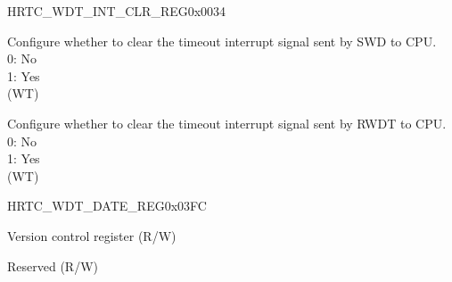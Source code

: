 \begin{register}{H}{RTC\_WDT\_INT\_CLR\_REG}{0x0034}\label{regdesc:RTCWDTINTCLRREG}
%
%
%
\regnewline%
\begin{regdesc}\begin{reglist}
\label{fielddesc:RTCWDTSUPERWDTINTCLR}\item [RTC\_WDT\_SWD\_INT\_CLR] Configure whether to clear the timeout interrupt signal sent by SWD to CPU.\\
0: No \\
1: Yes  \\ (WT)
\label{fielddesc:RTCWDTINTCLR}\item [RTC\_WDT\_INT\_CLR] Configure whether to clear the timeout interrupt signal sent by RWDT to CPU.\\
0: No \\
1: Yes  \\ (WT)
\end{reglist}\end{regdesc}
\end{register}


\begin{register}{H}{RTC\_WDT\_DATE\_REG}{0x03FC}\label{regdesc:RTCWDTDATEREG}
%
%
\regnewline%
\begin{regdesc}\begin{reglist}
\label{fielddesc:RTCWDTDATE}\item [RTC\_WDT\_DATE] Version control register (R/W)
\label{fielddesc:RTCWDTCLKEN}\item [RTC\_WDT\_CLK\_EN] Reserved (R/W)
\end{reglist}\end{regdesc}
\end{register}